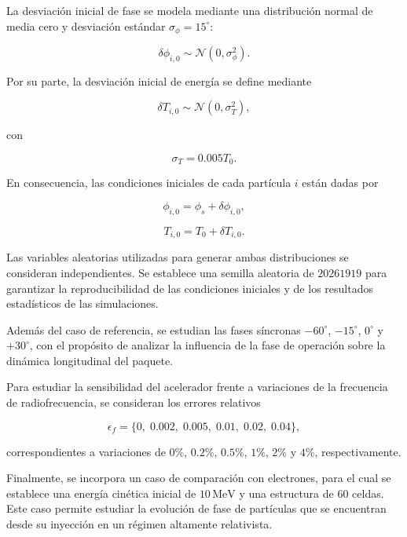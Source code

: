 La desviación inicial de fase se modela mediante una distribución normal de media cero y desviación estándar $\sigma_\phi=15^\circ$:

\begin{equation}
    \delta\phi_{i,0}\sim
    \mathcal{N}(0,\sigma_\phi^2).
\end{equation}

Por su parte, la desviación inicial de energía se define mediante

\begin{equation}
    \delta T_{i,0}\sim
    \mathcal{N}(0,\sigma_T^2),
\end{equation}

con

\begin{equation}
    \sigma_T=0.005T_0.
\end{equation}

En consecuencia, las condiciones iniciales de cada partícula $i$ están dadas por

\begin{equation}
    \phi_{i,0}=\phi_s+\delta\phi_{i,0},
\end{equation}

\begin{equation}
    T_{i,0}=T_0+\delta T_{i,0}.
\end{equation}

Las variables aleatorias utilizadas para generar ambas distribuciones se consideran independientes. Se establece una semilla aleatoria de $20261919$ para garantizar la reproducibilidad de las condiciones iniciales y de los resultados estadísticos de las simulaciones.

Además del caso de referencia, se estudian las fases síncronas
$-60^\circ$, $-15^\circ$, $0^\circ$ y $+30^\circ$, con el propósito de analizar la influencia de la fase de operación sobre la dinámica longitudinal del paquete.

Para estudiar la sensibilidad del acelerador frente a variaciones de la frecuencia de radiofrecuencia, se consideran los errores relativos

\begin{equation}
    \epsilon_f=
    \{0,\;0.002,\;0.005,\;0.01,\;0.02,\;0.04\},
\end{equation}

correspondientes a variaciones de $0\%$, $0.2\%$, $0.5\%$,
$1\%$, $2\%$ y $4\%$, respectivamente.

Finalmente, se incorpora un caso de comparación con electrones, para el cual se establece una energía cinética inicial de
$10\,\mathrm{MeV}$ y una estructura de 60 celdas. Este caso permite estudiar la evolución de fase de partículas que se encuentran desde su inyección en un régimen altamente relativista.

